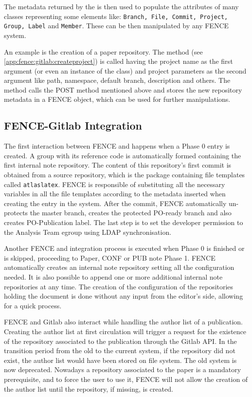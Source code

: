 The metadata returned by the  is then used to populate the attributes of many classes representing some \gitlab elements like:
\texttt{Branch, File, Commit, Project, Group, Label} and \texttt{Member}.
These can be then manipulated by any FENCE system.

An example is the creation of a paper repository.
The  method (see \cref{app:fence:gitlab:createproject}) is called having the project name as the first argument
(or even an instance of the  class) and project parameters as the second argument like path, namespace, default branch, description and others.
The method calls the POST method mentioned above and stores the new repository metadata in a FENCE  object, which can be used for further manipulations.



\subsection{FENCE-Gitlab Integration}%
\label{sec:FENCE-Gitlab_Integration}
The first interaction between FENCE and \gitlab happens when a Phase 0 entry is created.
A group with its reference code is automatically formed containing the first internal note repository.
The content of this repository’s first commit is obtained from a source repository,
which is the package containing file templates called \texttt{atlaslatex}.
FENCE is responsible of substituting all the necessary variables in all the file templates according to the metadata inserted when creating the entry in the system. After the commit, FENCE automatically un-protects the master branch, creates the protected PO-ready branch and also creates PO-Publication label. The last step is to set the developer permission to the Analysis Team egroup using LDAP synchronisation.

Another FENCE and \gitlab integration process is executed when Phase 0 is finished or is skipped, proceeding to Paper, CONF or PUB note Phase 1.
FENCE automatically creates an internal note repository setting all the configuration needed.
It is also possible to append one or more additional internal note repositories at any time.
The creation of the configuration of the repositories holding the document is done without any input from the editor’s side, allowing for a quick process.

FENCE and Gitlab also interact while handling the author list of a publication.
Creating the author list at first circulation will trigger a request for the existence of the \gitlab repository associated to the publication through the Gitlab API\@.
In the transition period from the old to the current system,
if the repository did not exist, the author list would have been stored on  file system.
The old system is now deprecated.
Nowadays a \gitlab repository associated to the paper is a mandatory prerequisite, and to force the user to use it,
FENCE will not allow the creation of the author list until the repository, if missing, is created.

